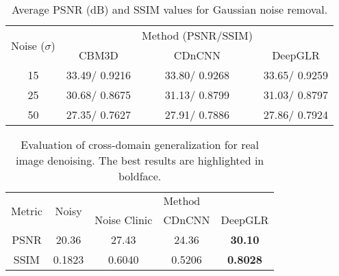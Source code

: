 \documentclass[10pt,twocolumn,letterpaper]{article}
\begin{document}
\begin{table}[htbp]
  \centering \scriptsize
  \caption{Average PSNR (dB) and SSIM values for Gaussian noise removal.}
    \begin{tabular}{c||c|c|c}
    \hline
    \multirow{2}[4]{*}{Noise ($\sigma$)} & \multicolumn{1}{c}{} & \multicolumn{1}{l|}{Method (PSNR/SSIM)} &  \bigstrut\\
\cline{2-4}          & CBM3D & CDnCNN & DeepGLR \bigstrut\\
    \hline
    \hline
    15    &  33.49/ 0.9216 & 33.80/ 0.9268 & 33.65/ 0.9259 \bigstrut\\
    \hline
    25    &  30.68/ 0.8675  & 31.13/ 0.8799 & 31.03/ 0.8797 \bigstrut\\
    \hline
    50    & 27.35/ 0.7627 & 27.91/ 0.7886 & 27.86/ 0.7924 \bigstrut\\
    \hline
    \end{tabular}%
  \label{tab:gaussian}%
\end{table}%


\begin{table}[htbp]
  \centering\scriptsize
  \caption{Evaluation of cross-domain generalization for real image denoising. The best results are highlighted in boldface.}
    \begin{tabular}{c|c||c|c|c}
    \hline
    \multirow{2}[4]{*}{Metric} & \multirow{2}[4]{*}{Noisy} & \multicolumn{3}{c}{\vspace{-1.0pt}$\phantom{\hat{I}}\mathop{\textrm{Method} }\limits_{\phantom{.}}\phantom{\hat{I}}$} \bigstrut\\
\cline{3-5}          &   & Noise Clinic & CDnCNN & DeepGLR  \bigstrut[t]\\
    \hline
    \hline
    PSNR  & 20.36   & 27.43 & 24.36& \textbf{30.10} \bigstrut[t]\\
    \hline
    SSIM & 0.1823   &0.6040 & 0.5206& \textbf{0.8028}  \bigstrut[b]\\
    \hline
    \end{tabular}%
  \label{tab:crossdomain}%
\end{table}%
\end{document}
